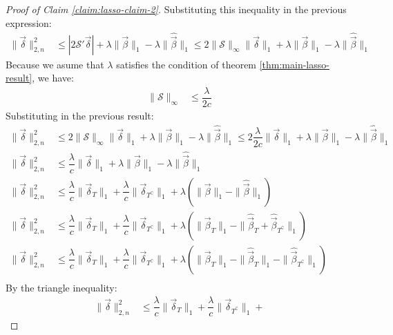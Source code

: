 \begin{proof}[Proof of Claim \ref{claim:lasso-claim-2}]
Substituting this inequality in the previous expression:
\begin{align*}
    \|\Vec{\delta}\|_{2, n}^{2}
    &\leq
    \left|2 \mathcal{S}' \Vec{\delta}\right| +
    \lambda \|\Vec{\beta}\|_{1} -
    \lambda \|\hat{\Vec{\beta}}\|_{1}
    \leq
    2 \|\mathcal{S}\|_{\infty} \|\Vec{\delta}\|_{1} +
    \lambda \|\Vec{\beta}\|_{1} -
    \lambda \|\hat{\Vec{\beta}}\|_{1}
\end{align*}
Because we asume that $\lambda$ satisfies the condition of theorem \ref{thm:main-lasso-result}, we have:
\begin{align*}
    \|\mathcal{S}\|_{\infty} &\leq \dfrac{\lambda}{2c}
\end{align*}
Substituting in the previous result:
\begin{align*}
    \|\Vec{\delta}\|_{2, n}^{2}
    &\leq
    2 \|\mathcal{S}\|_{\infty} \|\Vec{\delta}\|_{1} +
    \lambda \|\Vec{\beta}\|_{1} -
    \lambda \|\hat{\Vec{\beta}}\|_{1} 
    \leq
    2 \dfrac{\lambda}{2c} \|\Vec{\delta}\|_{1} +
    \lambda \|\Vec{\beta}\|_{1} -
    \lambda \|\hat{\Vec{\beta}}\|_{1}\\
    \|\Vec{\delta}\|_{2, n}^{2}
    &\leq
    \dfrac{\lambda}{c} \|\Vec{\delta}\|_{1} +
    \lambda \|\Vec{\beta}\|_{1} -
    \lambda \|\hat{\Vec{\beta}}\|_{1}\\
    \|\Vec{\delta}\|_{2, n}^{2}
    &\leq
    \dfrac{\lambda}{c} \|\Vec{\delta}_T\|_{1} +
    \dfrac{\lambda}{c} \|\Vec{\delta}_{T^{\complement}}\|_{1} +
    \lambda \left(
        \|\Vec{\beta}\|_{1} -
        \|\hat{\Vec{\beta}}\|_{1}
    \right)\\
    \|\Vec{\delta}\|_{2, n}^{2}
    &\leq
    \dfrac{\lambda}{c} \|\Vec{\delta}_T\|_{1} +
    \dfrac{\lambda}{c} \|\Vec{\delta}_{T^{\complement}}\|_{1} +
    \lambda \left(
        \|\Vec{\beta}_T\|_{1} -
        \|\hat{\Vec{\beta}}_T + \hat{\Vec{\beta}}_{T^\complement}\|_{1}
    \right)\\
    \|\Vec{\delta}\|_{2, n}^{2}
    &\leq
    \dfrac{\lambda}{c} \|\Vec{\delta}_T\|_{1} +
    \dfrac{\lambda}{c} \|\Vec{\delta}_{T^{\complement}}\|_{1} +
    \lambda \left(
        \|\Vec{\beta}_T\|_{1} -
        \|\hat{\Vec{\beta}}_T\|_{1} - 
        \|\hat{\Vec{\beta}}_{T^\complement}\|_{1}
    \right)\\
\end{align*}
By the triangle inequality:
\begin{align*}
    \|\Vec{\delta}\|_{2, n}^{2}
    &\leq
    \dfrac{\lambda}{c} \|\Vec{\delta}_T\|_{1} +
    \dfrac{\lambda}{c} \|\Vec{\delta}_{T^{\complement}}\|_{1} +

\end{align*}
\end{proof}
